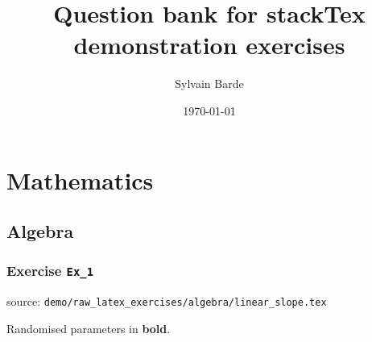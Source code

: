 \documentclass[a4paper, leqno, 12pt]{report}
\title{\bf Question bank for  stackTex demonstration exercises}
\author{Sylvain Barde}
\date{\today}
\begin{document}
\maketitle                              %
\hypertarget{contents}{}                %
\tableofcontents                        %

\singlespacing

\chapter{Mathematics}
\section{Algebra}
\subsection{Exercise \texttt{Ex\_1}}
source: \texttt{demo/raw\_latex\_exercises/algebra/linear\_slope.tex}

Randomised parameters in \textbf{bold}. 
\end{document}
